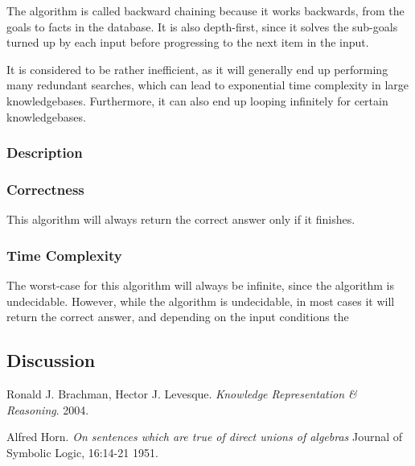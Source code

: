 \documentclass{article}
\begin{document}
The algorithm is called backward chaining because it works backwards, from the
goals to facts in the database. It is also depth-first, since it solves the
sub-goals turned up by each input before progressing to the next item in the
input.

It is considered to be rather inefficient, as it will generally end up
performing many redundant searches, which can lead to exponential time
complexity in large knowledgebases. Furthermore, it can also end up looping
infinitely for certain knowledgebases.

\subsubsection{Description}

\subsubsection{Correctness}

This algorithm will always return the correct answer only if it finishes.

\subsubsection{Time Complexity}

The worst-case for this algorithm will always be infinite, since the algorithm
is undecidable. However, while the algorithm is undecidable, in most cases it
will return the correct answer, and depending on the input conditions the 

\subsection{Discussion}


\begin{thebibliography}{9}

  Ronald J. Brachman, Hector J. Levesque.
  \emph{Knowledge Representation \& Reasoning}.
  2004.

  Alfred Horn.
  \emph{On sentences which are true of direct unions of algebras}
  Journal of Symbolic Logic, 16:14-21
  1951.
\end{thebibliography}
\end{document}
